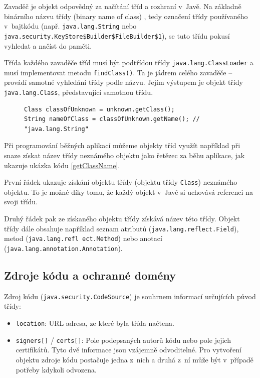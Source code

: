 Zavaděč je objekt odpovědný za načítání tříd a rozhraní v~Javě. Na základně binárního názvu třídy (binary name of class) \cite{binaryNameOfClass}, tedy označení třídy používaného v~bajtkódu (např. {\tt java.lang.String} nebo {\tt java.security.KeyStore\$Builder\$FileBuilder\$1}), se tuto třídu pokusí vyhledat a načíst do paměti. \cite{refClassLoader}

Třída každého zavaděče tříd musí být podtřídou třídy {\tt java.lang.ClassLoader} a musí implementovat metodu {\tt findClass()}. Ta je jádrem celého zavaděče -- provádí samotné vyhledání třídy podle názvu. Jejím výstupem je objekt třídy {\tt java.lang.Class}, představující samotnou třídu. \cite{refClassLoader}

\begin{figure}[tbh]
\begin{lstlisting}[caption=Získávání názvu třídy neznámého objektu, label=getClassName]
Class classOfUnknown = unknown.getClass();
String nameOfClass = classOfUnknown.getName(); // "java.lang.String"
\end{lstlisting}
\end{figure}

Při programování běžných aplikací můžeme objekty tříd využít například při snaze získat název třídy neznámého objektu jako řetězec za běhu aplikace,
jak ukazuje ukázka kódu \ref{getClassName}.

První řádek ukazuje získání objektu třídy (objektu třídy {\tt Class}) neznámého objektu.
To je možné díky tomu, že každý objekt v~Javě si uchovává referenci na svoji třídu.

Druhý řádek pak ze získaného objektu třídy získává název této třídy.
Objekt třídy dále obsahuje například seznam atributů ({\tt java.lang.reflect.Field}), metod ({\tt java.lang.refl ect.Method})
nebo anotací ({\tt java.lang.annotation.Annotation}). \cite{sourceClass}

\subsection{Zdroje kódu a ochranné domény} \label{codeSourceAprotectionDomains}

Zdroj kódu ({\tt java.security.CodeSource}) je souhrnem informací určujících původ třídy:~\cite{sourceCodeSource}

\begin{itemize}
  \item {\tt location}: URL adresa, ze které byla třída načtena.
  \item {\tt signers[]} / {\tt certs[]}: Pole podepsaných autorů kódu nebo pole jejich certifikátů. Tyto dvě informace jsou vzájemně odvoditelné. Pro vytvoření objektu zdroje kódu postačuje jedna z~nich a druhá z~ní může být v~případě potřeby kdykoli odvozena.
\end{itemize}

